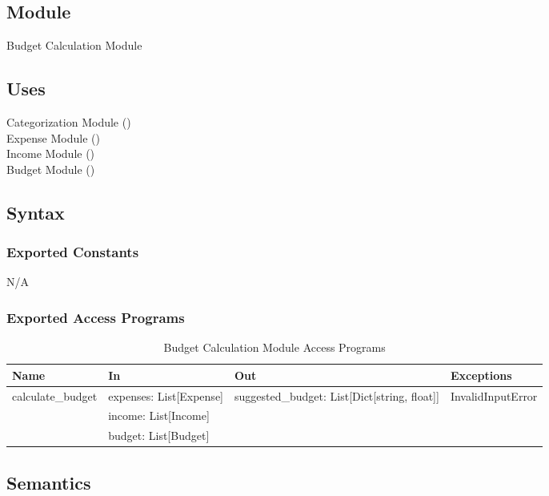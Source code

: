 \documentclass[12pt, titlepage]{article}
\begin{document}
\subsection{Module}

Budget Calculation Module

\subsection{Uses}
Categorization Module ()\\
Expense Module ()\\
Income Module ()\\
Budget Module ()\\

\subsection{Syntax}

\subsubsection{Exported Constants}
N/A

\subsubsection{Exported Access Programs}

\begin{center}
\begin{table}[H]
  \caption{Budget Calculation Module Access Programs}
\begin{tabular}{p{4cm} p{4cm} p{4cm} p{4cm}}
\hline
\textbf{Name} & \textbf{In} & \textbf{Out} & \textbf{Exceptions} \\
\hline
calculate\_budget & expenses: List[Expense] & suggested\_budget: List[Dict[string, float]]
& InvalidInputError \\
& income: List[Income] & &  \\
& budget: List[Budget] & &  \\
\hline
\end{tabular}
\end{table}
\end{center}

\subsection{Semantics}
\end{document}
